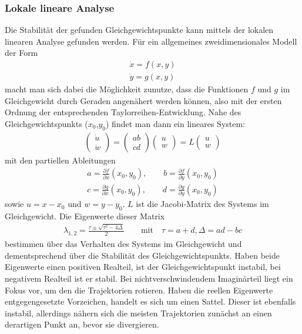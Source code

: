 \documentclass[12pt,a4paper]{article}
\begin{document}
\subsubsection{Lokale lineare Analyse}
Die Stabilität der gefunden Gleichgewichtspunkte kann mittels der lokalen linearen Analyse gefunden werden. Für ein allgemeines zweidimensionales Modell der Form
\begin{align}
\dot{x}=f(x,y)\\
\dot{y}=g(x,y)
\end{align}
macht man sich dabei die Möglichkeit zunutze, dass die Funktionen $f$ und $g$ im Gleichgewicht durch Geraden angenähert werden können, also mit der ersten Ordnung der entsprechenden Taylorreihen-Entwicklung. Nahe des Gleichgewichtspunkts ($x_0$,$y_0$) findet man dann ein lineares System:
\begin{align}				
\left(\begin{matrix}\dot{u}\\\dot{w}
\end{matrix}\right)
=\left(\begin{matrix}a b\\
c d\end{matrix}\right)\left(\begin{matrix}u\\w\end{matrix}\right)=L\left(\begin{matrix}u\\w\end{matrix}\right)
\end{align}
mit den partiellen Ableitungen
\begin{align}
a=\frac{\partial f}{\partial x}(x_0,y_0),\qquad b=\frac{\partial f}{\partial y}(x_0,y_0) \\
c=\frac{\partial g}{\partial x}(x_0,y_0),\qquad d=\frac{\partial g}{\partial y}(x_0,y_0)
\end{align}
sowie $u=x-x_0$ und $w=y-y_0$. $L$ ist die Jacobi-Matrix des Systems im Gleichgewicht. Die Eigenwerte dieser Matrix
\begin{align}
\lambda_{1,2}=\frac{\tau\pm\sqrt{\tau^2-4\Delta}}{2}\qquad \text{mit}\quad \tau=a+d, \Delta=ad-bc
\end{align} bestimmen über das Verhalten des Systems im Gleichgewicht und dementsprechend über die Stabilität des Gleichgewichtspunkts. Haben beide Eigenwerte einen positiven Realteil, ist der Gleichgewichtspunkt instabil, bei negativem Realteil ist er stabil. Bei nichtverschwindendem Imaginärteil liegt ein Fokus vor, um den die Trajektorien rotieren. Haben die reellen Eigenwerte entgegengesetzte Vorzeichen, handelt es sich um einen Sattel. Dieser ist ebenfalls instabil, allerdings nähern sich die meisten Trajektorien zunächst an einen derartigen Punkt an, bevor sie divergieren.
\end{document}
